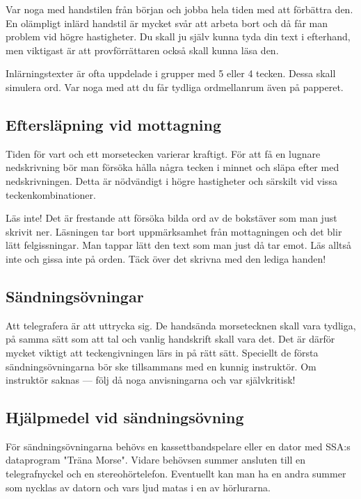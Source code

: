 Var noga med handstilen från början och jobba hela tiden med att förbättra den. En
olämpligt inlärd handstil är mycket svår att arbeta bort och då får man problem vid högre
hastigheter. Du skall ju själv kunna tyda din text i efterhand, men viktigast är att
provförrättaren också skall kunna läsa den.

Inlärningstexter är ofta uppdelade i grupper med 5 eller 4 tecken. Dessa skall simulera
ord. Var noga med att du får tydliga ordmellanrum även på papperet.

\subsection{Eftersläpning vid mottagning}

Tiden för vart och ett morsetecken varierar kraftigt. För att få en lugnare nedskrivning
bör man försöka hålla några tecken i minnet och släpa efter med nedskrivningen. Detta
är nödvändigt i högre hastigheter och särskilt vid vissa teckenkombinationer.

Läs inte! Det är frestande att försöka bilda ord av de bokstäver som man just
skrivit ner. Läsningen tar bort uppmärksamhet från mottagningen och det blir lätt felgissningar. Man tappar lätt den text som man just då tar emot. Läs alltså inte och
gissa inte på orden. Täck över det skrivna med den lediga handen!

\subsection{Sändningsövningar}

Att telegrafera är att uttrycka sig. De handsända morsetecknen skall vara tydliga, på
samma sätt som att tal och vanlig handskrift skall vara det. Det är därför mycket viktigt
att teckengivningen lärs in på rätt sätt. Speciellt de första sändningsövningarna bör ske
tillsammans med en kunnig instruktör.
Om instruktör saknas --- följ då noga anvisningarna och var självkritisk!

\subsection{Hjälpmedel vid sändningsövning}

För sändningsövningarna behövs en kassettbandspelare eller en dator med SSA:s
dataprogram "Träna Morse". Vidare behövsen summer ansluten till en telegrafnyckel
och en stereohörtelefon. Eventuellt kan man ha en andra summer som nycklas av datorn
och vars ljud matas i en av hörlurarna.

